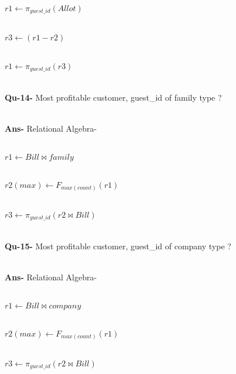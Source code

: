 \documentclass[a4,12pt]{report}
\begin{document}
\begin{flushleft}
			$ r1 \leftarrow \pi_{guest\_id}(Allot) $ \\\
			
			$ r3 \leftarrow (r1-r2) $ \\\
			
			$ r1 \leftarrow \pi_{guest\_id}(r3) $ \\\
			
\textbf{Qu-14-} Most profitable customer, guest\_id of family type ? \\\

\textbf{Ans-} Relational Algebra- \\\

			$ r1 \leftarrow Bill \bowtie family $ \\\
			
			$ r2(max) \leftarrow F_{max(count)}(r1) $ \\\
			
			$ r3 \leftarrow \pi_{guest\_id}(r2 \bowtie Bill ) $ \\\
			
			
\textbf{Qu-15-} Most profitable customer, guest\_id of company type ? \\\

\textbf{Ans-} Relational Algebra- \\\

			$ r1 \leftarrow Bill \bowtie company $ \\\
			
			$ r2(max) \leftarrow F_{max(count)}(r1) $ \\\
			
			$ r3 \leftarrow \pi_{guest\_id}(r2 \bowtie Bill ) $ \\\
			


                 
 \end{flushleft}
\end{document}
